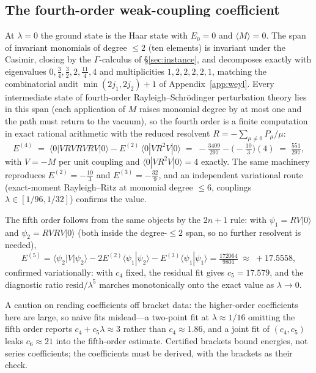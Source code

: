 \documentclass[11pt]{article}
\theoremstyle{definition}
\theoremstyle{remark}
\begin{document}
\subsection{The fourth-order weak-coupling coefficient}\label{app:fourth}
At $\lambda = 0$ the ground state is the Haar state with $E_0 = 0$ and
$\langle M\rangle = 0$.  The span of invariant monomials of degree
$\le 2$ (ten elements) is invariant under the Casimir, closing by the
$\Gamma$-calculus of \S\ref{sec:instance}, and decomposes exactly with
eigenvalues $0, \tfrac34, \tfrac32, 2, \tfrac{11}4, 4$ and
multiplicities $1,2,2,2,2,1$, matching the combinatorial audit
$\min(2j_1,2j_2)+1$ of Appendix~\ref{app:weyl}.  Every intermediate
state of fourth-order Rayleigh--Schr\"odinger perturbation theory lies
in this span (each application of $M$ raises monomial degree by at
most one and the path must return to the vacuum), so the fourth order
is a finite computation in exact rational arithmetic with the reduced
resolvent $R = -\sum_{\mu \ne 0} P_\mu/\mu$:
\[
E^{(4)} \;=\; \langle 0|VRVRVRV|0\rangle - E^{(2)}\,\langle
0|VR^2V|0\rangle
\;=\; -\tfrac{3409}{297} - \big(-\tfrac{10}{3}\big)(4)
\;=\; \tfrac{551}{297},
\]
with $V = -M$ per unit coupling and $\langle 0|VR^2V|0\rangle = 4$
exactly.  The same machinery reproduces $E^{(2)} = -\tfrac{10}{3}$ and
$E^{(3)} = -\tfrac{32}{9}$, and an independent variational route
(exact-moment Rayleigh--Ritz at monomial degree $\le 6$, couplings
$\lambda \in [1/96, 1/32]$) confirms the value.

The fifth order follows from the same objects by the $2n{+}1$ rule:
with $\psi_1 = RV|0\rangle$ and $\psi_2 = RVRV|0\rangle$ (both inside
the degree-$\le 2$ span, so no further resolvent is needed),
\[
E^{(5)} = \langle\psi_2|V|\psi_2\rangle
- 2E^{(2)}\langle\psi_1|\psi_2\rangle
- E^{(3)}\langle\psi_1|\psi_1\rangle
= \tfrac{172064}{9801} \;\approx\; +17.5558,
\]
confirmed variationally: with $c_4$ fixed, the residual fit gives
$c_5 = 17.579$, and the diagnostic ratio
$\mathrm{resid}/\lambda^5$ marches monotonically onto the exact value
as $\lambda \to 0$.

A caution on reading coefficients off bracket data: the higher-order
coefficients here are large, so naive fits mislead---a two-point fit
at $\lambda \approx 1/16$ omitting the fifth order reports $c_4 +
c_5\lambda \approx 3$ rather than $c_4 \approx 1.86$, and a joint fit
of $(c_4, c_5)$ leaks $c_6 \approx 21$ into the fifth-order estimate.
Certified brackets bound energies, not series coefficients; the
coefficients must be derived, with the brackets as their check.
\end{document}
